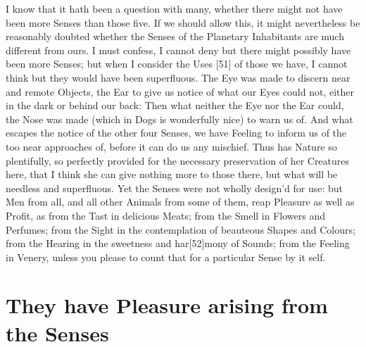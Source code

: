 \documentclass[letterpaper]{book}
\begin{document}
I know that it hath been a question with many, whether there might not
have been more Senses than those five. If we should allow this, it might
nevertheless be reasonably doubted whether the Senses of the Planetary
Inhabitants are much different from ours. I must confess, I cannot deny but
there might possibly have been more Senses; but when I consider the Uses
[51] of those we have, I cannot think but they would have been superfluous.
The Eye was made to discern near and remote Objects, the Ear to give us
notice of what our Eyes could not, either in the dark or behind our back:
Then what neither the Eye nor the Ear could, the Nose was made (which in
Dogs is wonderfully nice) to warn us of. And what escapes the notice of the
other four Senses, we have Feeling to inform us of the too near approaches
of, before it can do us any mischief. Thus has Nature so plentifully, so
perfectly provided for the necessary preservation of her Creatures here, that
I think she can give nothing more to those there, but what will be needless
and superfluous. Yet the Senses were not wholly design'd for use: but Men
from all, and all other Animals from some of them, reap Pleasure as well
as Profit, as from the Tast in delicious Meats; from the Smell in Flowers
and Perfumes; from the Sight in the contemplation of beauteous Shapes
and Colours; from the Hearing in the sweetness and har[52]mony of Sounds;
from the Feeling in Venery, unless you please to count that for a particular
Sense by it self.


\section{They have Pleasure arising from the Senses}
\end{document}
